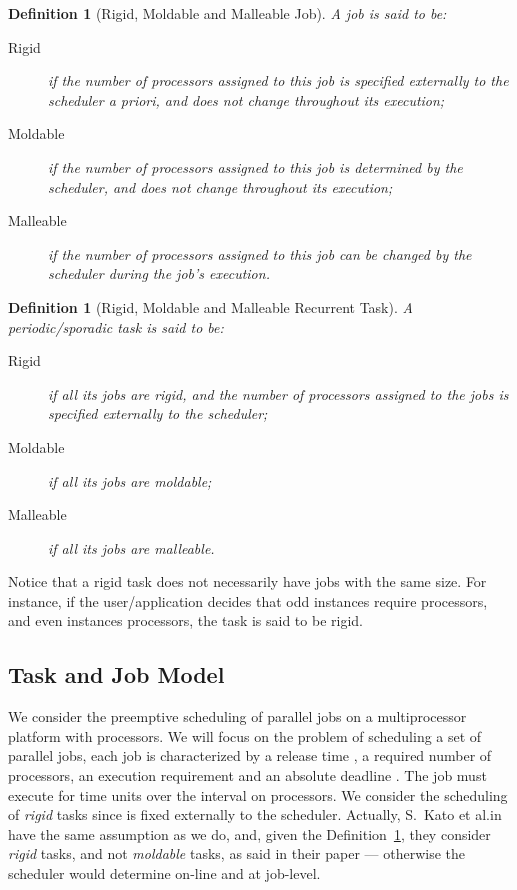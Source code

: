 \documentclass[a4paper]{article}
\newtheorem{definition}[theorem]{Definition}
\begin{document}
\begin{definition}[Rigid, Moldable and Malleable Job]
A \emph{job} is said to be:
\begin{description}
\item[Rigid] if the number of processors assigned to this job is specified externally to the scheduler a priori, and does not change throughout its execution;
\item[Moldable] if the number of processors assigned to this job is determined by the scheduler, and does not change throughout its execution;
\item[Malleable] if the number of processors assigned to this job can be changed by the scheduler during the job's execution.
\end{description}
\end{definition}

\begin{definition}[Rigid, Moldable and Malleable Recurrent Task]\label{def:taskparallel}
A periodic/sporadic \emph{task} is said to be:
\begin{description}
\item [Rigid] if all its jobs are rigid, and the number of processors assigned to the jobs is specified externally to the scheduler;
\item [Moldable] if all its jobs are moldable;
\item [Malleable] if all its jobs are malleable.
\end{description}
\end{definition}

Notice that a rigid task does not necessarily have jobs with the same size. For instance, if the user/application decides that odd instances require  processors, and even instances  processors, the task is said to be rigid.


\subsection{Task and Job Model}
We consider the preemptive scheduling of parallel jobs on a multiprocessor platform with  processors. We will focus on the problem of scheduling a set of parallel jobs, each job  is characterized by a release time ,  a required number of processors, an execution requirement  and an absolute  deadline . The job  must execute for  time units over the interval  on  processors. We consider the scheduling of \emph{rigid} tasks since  is fixed externally to the scheduler. Actually, S.~Kato et al.\@ in~\cite{kato2009gang} have the same assumption as we do, and, given the Definition~\ref{def:taskparallel}, they consider \emph{rigid} tasks, and not \emph{moldable} tasks, as said in their paper --- otherwise the scheduler would determine  on-line and at job-level. 
\end{document}
